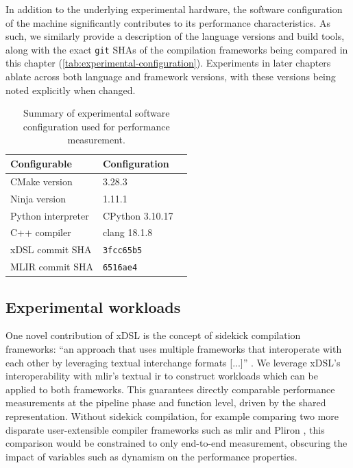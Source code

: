 In addition to the underlying experimental hardware, the software configuration of the machine significantly contributes to its performance characteristics.
As such, we similarly provide a description of the language versions and build tools, along with the exact \texttt{git} SHAs of the compilation frameworks being compared in this chapter (\autoref{tab:experimental-configuration}).
Experiments in later chapters ablate across both language and framework versions, with these versions being noted explicitly when changed.

\begin{table}[H]
  \caption{Summary of experimental software configuration used for performance measurement.}
  \label{tab:experimental-configuration}
  \centering
  \begin{tabular}{lll}
    \toprule
    \textbf{Configurable} & \textbf{Configuration} \\
    \midrule
    CMake version & 3.28.3 \\
    Ninja version & 1.11.1 \\
    \midrule
    Python interpreter & CPython 3.10.17 \\
    C++ compiler & clang 18.1.8 \\
    \midrule
    xDSL commit SHA & \texttt{3fcc65b5} \\
    MLIR commit SHA & \texttt{6516ae4} \\
    \bottomrule
  \end{tabular}
\end{table}


\subsection{Experimental workloads}
\label{ssec:experimental-workloads}

One novel contribution of xDSL is the concept of sidekick compilation frameworks: ``an approach that uses multiple frameworks that interoperate with each other by leveraging textual interchange formats [...]'' \cite{fehrXDSLSidekickCompilation2025}.
We leverage xDSL's interoperability with \ac{mlir}'s textual \ac{ir} to construct workloads which can be applied to both frameworks.
This guarantees directly comparable performance measurements at the pipeline phase and function level, driven by the shared representation.
Without sidekick compilation, for example comparing two more disparate user-extensible compiler frameworks such as \ac{mlir} and Pliron \cite{vaivaswathanagarajVaivaswathaPliron2025}, this comparison would be constrained to only end-to-end measurement, obscuring the impact of variables such as dynamism on the performance properties.

